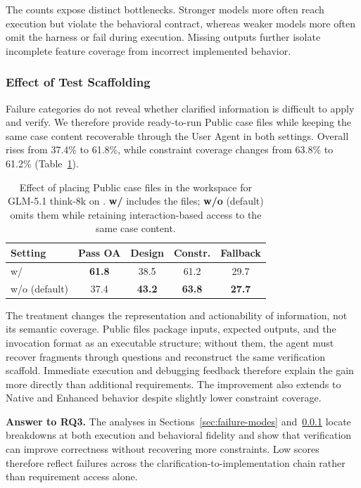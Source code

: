 The counts expose distinct bottlenecks. Stronger models more often reach execution but violate the behavioral contract, whereas weaker models more often omit the harness or fail during execution. Missing outputs further isolate incomplete feature coverage from incorrect implemented behavior.

\subsubsection{Effect of Test Scaffolding}
\label{sec:test-scaffolding}

Failure categories do not reveal whether clarified information is difficult to apply and verify. We therefore provide ready-to-run Public case files while keeping the same case content recoverable through the User Agent in both settings. Overall rises from 37.4\% to 61.8\%, while constraint coverage changes from 63.8\% to 61.2\% (Table~\ref{tab:test-scaffold}).

\begin{table}[t]
\centering
\caption{Effect of placing Public case files in the workspace for GLM-5.1 think-8k on \rcblite{}. \textbf{w/} includes the files; \textbf{w/o} (default) omits them while retaining interaction-based access to the same case content.}
\label{tab:test-scaffold}
\small
\begin{tabular}{lcccc}
\toprule
Setting & Pass OA & Design & Constr. & Fallback \\
\midrule
w/ & \textbf{61.8} & 38.5 & 61.2 & 29.7 \\
w/o (default) & 37.4 & \textbf{43.2} & \textbf{63.8} & \textbf{27.7} \\
\bottomrule
\end{tabular}
\end{table}

The treatment changes the representation and actionability of information, not its semantic coverage. Public files package inputs, expected outputs, and the invocation format as an executable structure; without them, the agent must recover fragments through questions and reconstruct the same verification scaffold. Immediate execution and debugging feedback therefore explain the gain more directly than additional requirements. The improvement also extends to Native and Enhanced behavior despite slightly lower constraint coverage.

\textbf{Answer to RQ3.} The analyses in Sections~\ref{sec:failure-modes} and~\ref{sec:test-scaffolding} locate breakdowns at both execution and behavioral fidelity and show that verification can improve correctness without recovering more constraints. Low scores therefore reflect failures across the clarification-to-implementation chain rather than requirement access alone.


